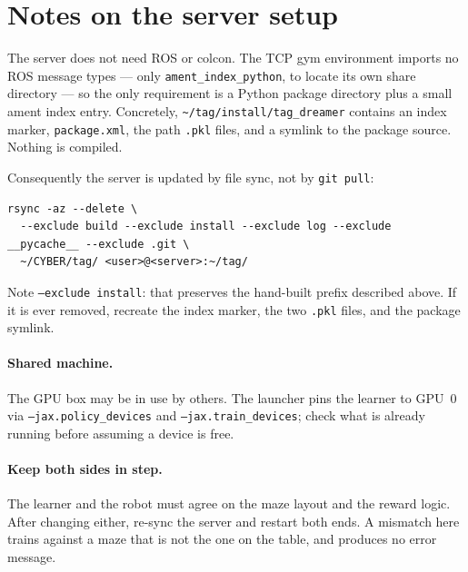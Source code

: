 \documentclass[11pt,a4paper]{article}
\newcommand{\cmd}[1]{\texttt{\small #1}}
\newcommand{\file}[1]{\texttt{\small #1}}
\begin{document}
\section{Notes on the server setup}
\label{sec:server-notes}

The server does not need ROS or colcon. The TCP gym environment imports no ROS
message types --- only \cmd{ament\_index\_python}, to locate its own share
directory --- so the only requirement is a Python package directory plus a small
ament index entry. Concretely, \file{\~{}/tag/install/tag\_dreamer} contains an
index marker, \file{package.xml}, the path \file{.pkl} files, and a symlink to the
package source. Nothing is compiled.

Consequently the server is updated by file sync, not by \cmd{git pull}:

\begin{lstlisting}
rsync -az --delete \
  --exclude build --exclude install --exclude log --exclude __pycache__ --exclude .git \
  ~/CYBER/tag/ <user>@<server>:~/tag/
\end{lstlisting}

Note \cmd{--exclude install}: that preserves the hand-built prefix described
above. If it is ever removed, recreate the index marker, the two \file{.pkl}
files, and the package symlink.

\paragraph{Shared machine.} The GPU box may be in use by others. The launcher
pins the learner to GPU~0 via \cmd{--jax.policy\_devices} and
\cmd{--jax.train\_devices}; check what is already running before assuming a device
is free.

\paragraph{Keep both sides in step.} The learner and the robot must agree on the
maze layout and the reward logic. After changing either, re-sync the server and
restart both ends. A mismatch here trains against a maze that is not the one on
the table, and produces no error message.
\end{document}
